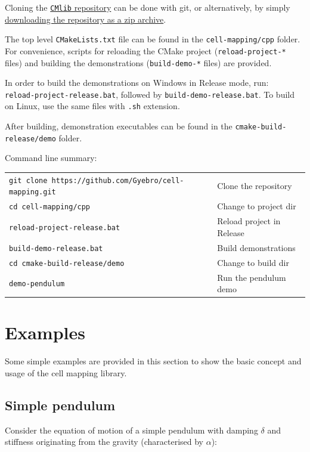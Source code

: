 \documentclass[11pt]{article}
\begin{document}
Cloning the \href{https://github.com/Gyebro/cell-mapping.git}{\texttt{CMlib} repository} can be done with git, or alternatively, by simply  \href{https://github.com/Gyebro/cell-mapping/archive/master.zip}{downloading the repository as a zip archive}.

The top level \texttt{CMakeLists.txt} file can be found in the \texttt{cell-mapping/cpp} folder. For convenience, scripts for reloading the CMake project (\texttt{reload-project-*} files) and building the demonstrations (\texttt{build-demo-*} files) are provided.

In order to build the demonstrations on Windows in Release mode, run:\\
\texttt{reload-project-release.bat}, followed by \texttt{build-demo-release.bat}. 
To build on Linux, use the same files with \texttt{.sh} extension.

After building, demonstration executables can be found in the \texttt{cmake-build-release/demo} folder.

Command line summary:\\
\begin{tabular}{l|l}
		\texttt{git clone https://github.com/Gyebro/cell-mapping.git} & Clone the repository \\
		\texttt{cd cell-mapping/cpp} & Change to project dir \\
		\texttt{reload-project-release.bat} & Reload project in Release\\
		\texttt{build-demo-release.bat} & Build demonstrations\\
		\texttt{cd cmake-build-release/demo} & Change to build dir\\
		\texttt{demo-pendulum} & Run the pendulum demo
\end{tabular}


\section{Examples}

Some simple examples are provided in this section to show the basic concept and usage of the cell mapping library.

\subsection{Simple pendulum}

Consider the equation of motion of a simple pendulum with damping $\delta$ and stiffness originating from the gravity (characterised by $\alpha$):
\end{document}
